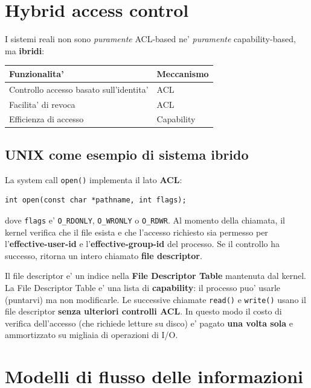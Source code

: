 \section{Hybrid access control}
I sistemi reali non sono \textit{puramente} ACL-based ne' \textit{puramente} capability-based, ma \textbf{ibridi}:

\begin{center}
  \footnotesize
  \begin{tabular}{|l|l|}
    \hline
    \textbf{Funzionalita'} & \textbf{Meccanismo} \\ \hline
    Controllo accesso basato sull'identita' & ACL \\ \hline
    Facilita' di revoca & ACL \\ \hline
    Efficienza di accesso & Capability \\ \hline
  \end{tabular}
\end{center}

\subsection{UNIX come esempio di sistema ibrido}
La system call \texttt{open()} implementa il lato \textbf{ACL}:
\begin{verbatim}
int open(const char *pathname, int flags);
\end{verbatim}
dove \texttt{flags} e' \texttt{O\_RDONLY}, \texttt{O\_WRONLY} o \texttt{O\_RDWR}. Al momento della chiamata, il kernel verifica che il file esista e che l'accesso richiesto sia permesso per l'\textbf{effective-user-id} e l'\textbf{effective-group-id} del processo. Se il controllo ha successo, ritorna un intero chiamato \textbf{file descriptor}.

Il file descriptor e' un indice nella \textbf{File Descriptor Table} mantenuta dal kernel. La File Descriptor Table e' una lista di \textbf{capability}: il processo puo' usarle (puntarvi) ma non modificarle. Le successive chiamate \texttt{read()} e \texttt{write()} usano il file descriptor \textbf{senza ulteriori controlli ACL}. In questo modo il costo di verifica dell'accesso (che richiede letture su disco) e' pagato \textbf{una volta sola} e ammortizzato su migliaia di operazioni di I/O.

\section{Modelli di flusso delle informazioni}

